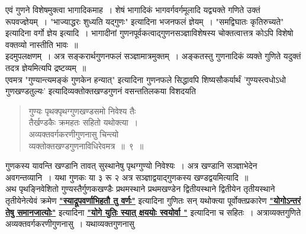 \documentclass[11pt, openany]{book}
\begin{document}
\newpage

 एवं गुणने विशेषमुक्त्वा भागादिकमाह~। शेषं भागादिकं 
भागवर्गवर्गमूलादि यद्व्यक्ते गणिते उक्तं रूपवज्ज्ञेयम्~। {\qt "भाज्याद्धरः
शुध्यति यद्गुणः"} इत्यादिना भजनफलं ज्ञेयम्~। {\qt "समद्विघातः कृतिरुच्यते"} इत्यादिना वर्गो ज्ञेय इत्यादि~। भागादीनां गुणनपूर्वकत्वाद्गुणनसञ्ज्ञाविशेषस्य चोक्तत्वात्तत्र कोऽपि विशेषो वक्तव्यो नास्तीति 
भावः~॥\\

\vspace{-3mm}
 इदमुपलक्षणम्~। अत्र सङ्करार्थगुणनफलं सञ्ज्ञामात्रमुक्तम्~। अङ्कतस्तु 
गुणनादिकं व्यक्ते गुणिते यदुक्तं तदत्र ज्ञेयमित्यपि द्रष्टव्यम्~॥ \\

\vspace{-3mm}
 एवमत्र {\qt "गुण्यान्त्यमङ्कं गुणकेन हन्यात्"} इत्यादिना गुणनफले 
सिद्धावपि शिष्यसौकर्यार्थं {\qt 'गुण्यस्त्वधोऽधो गुणखण्डतुल्यः'}
इत्यादिव्यक्तोक्तखण्डगुणनं वसन्ततिलकया विशदयति\textendash  

 \label{1.9}
\begin{quote}
    \bs
      गुण्यः पृथक्पृथग्गुणखण्डसमो निवेश्य तैः \\

\vspace{-7mm}
\hspace{1cm}  तैर्खण्डकैः क्रमहतः सहितो यथोक्त्या~। \\

 \vspace{-7mm}
 अव्यक्तवर्गकरणीगुणनासु चिन्त्यो \\

\vspace{-7mm}
\hspace{1cm}  व्यक्तोक्तखण्डगुणनाविधिरेवमत्र~॥~९~॥
\end{quote}

 गुणकस्य यावन्ति खण्डानि तावत् सुस्थानेषु पृथग्गुण्यो निवेश्यः~। अत्र 
खण्डानि सञ्ज्ञाभेदेन अवगन्तव्यानि~। यथा गुणकः या ३ रू २ अत्र सञ्ज्ञाद्वयाद्गुणकस्य खण्डद्वयमित्यादि~॥ \\

\vspace{-3mm}
 अथ पृथङ्निवेशितो गुण्यस्तैर्गुणकखण्डैः प्रथमस्थाने प्रथमखण्डेन 
द्वितीयस्थाने द्वितीयेन तृतीयस्थाने तृतीयेनेत्येवं क्रमेण
\hyperref[1.8]{\textbf{"स्याद्रूपवर्णाभिहतौ तु वर्णः"}} इत्यादिना गुणितः सन् यथोक्त्या पूर्वोक्तप्रकारेण \hyperref[7.1]{\textbf{"योगोऽन्तरं तेषु समानजात्योः"}} इत्यादिना \hyperref[1.3.1]{\textbf{"योगे युतिः स्यात् क्षययोः स्वयोर्वा "}} इत्यादिना च सहितः~। अत्राव्यक्तगुणिते अव्यक्तवर्गकरणीगुणनासु~। यथाव्यक्तगुणनासु
\newpage
\end{document}
